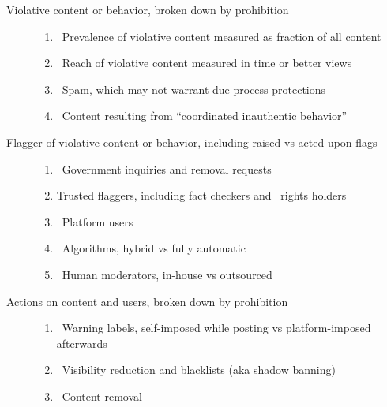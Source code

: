 
\begin{description}
\item[Violative content or behavior, broken down by prohibition]\hfill
    \begin{enumerate}
        \item {}~Prevalence of violative content measured as fraction
            of all content \label{itm:prevalence}
        \item {}~Reach of violative content measured in time
            or better views \label{itm:reach}
        \item {}~Spam, which may not warrant due process
            protections \label{itm:spam}
        \item {}~Content resulting from ``coordinated inauthentic
            behavior'' \label{itm:coordination}
    \end{enumerate}
\item[Flagger of violative content or behavior, including raised vs acted-upon flags]
    \hfill
    \begin{enumerate}[resume]
        \item {}~Government inquiries and removal requests
            \label{itm:government}
        \item {} Trusted flaggers, including fact checkers and \IP\
            rights holders \label{itm:flaggers}
        \item {}~Platform users \label{itm:users}
        \item \emo{robot}~Algorithms, hybrid vs fully automatic
            \label{itm:algorithms}
        \item {}~Human moderators, in-house vs outsourced
            \label{criterion:moderators}
    \end{enumerate}
\item[Actions on content and users, broken down by prohibition]\hfill
    \begin{enumerate}[resume]
        \item {}~Warning labels, self-imposed while posting vs
            platform-imposed afterwards \label{itm:labels}
        \item {}~Visibility reduction and blacklists (aka shadow
            banning) \label{itm:visibility}
        \item {}~Content removal \label{itm:removal}

\end{enumerate}
\end{description}
